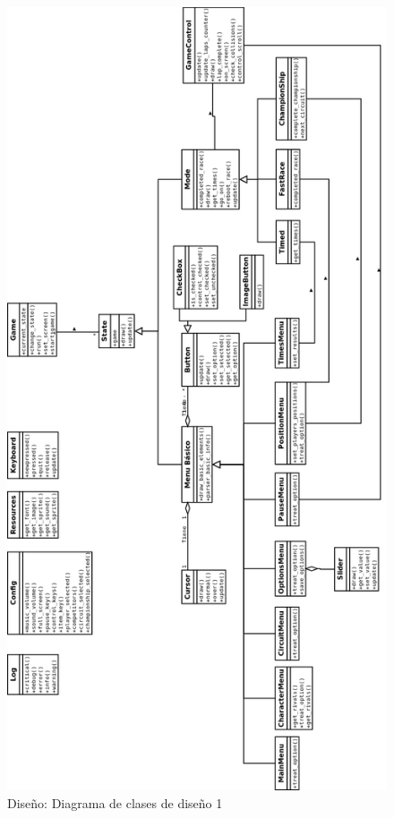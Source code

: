 \begin{figure}[H]
  \label{diagrama_clases_diseno}
  \begin{center}
    \includegraphics[scale=0.38]{imagenes/diseno/diagrama_clases_diseno1.png}
  \end{center}
  \caption{Diseño: Diagrama de clases de diseño 1}
\end{figure}

